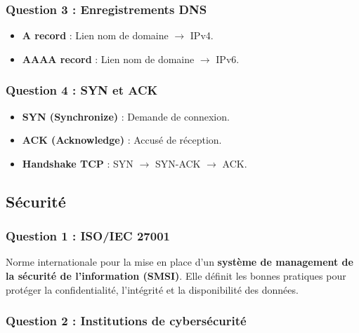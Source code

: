 \documentclass[12pt,a4paper]{article}
\begin{document}
\subsubsection{Question 3 : Enregistrements DNS}

\begin{itemize}
    \item \textbf{A record} : Lien nom de domaine $\rightarrow$ IPv4.
    \item \textbf{AAAA record} : Lien nom de domaine $\rightarrow$ IPv6.
\end{itemize}

\subsubsection{Question 4 : SYN et ACK}

\begin{itemize}
    \item \textbf{SYN (Synchronize)} : Demande de connexion.
    \item \textbf{ACK (Acknowledge)} : Accusé de réception.
    \item \textbf{Handshake TCP} : SYN $\rightarrow$ SYN-ACK $\rightarrow$ ACK.
\end{itemize}

\vspace{0.5cm}

\subsection{Sécurité}

\subsubsection{Question 1 : ISO/IEC 27001}

Norme internationale pour la mise en place d’un \textbf{système de management de la sécurité de l'information (SMSI)}. Elle définit les bonnes pratiques pour protéger la confidentialité, l’intégrité et la disponibilité des données.

\subsubsection{Question 2 : Institutions de cybersécurité}
\end{document}
